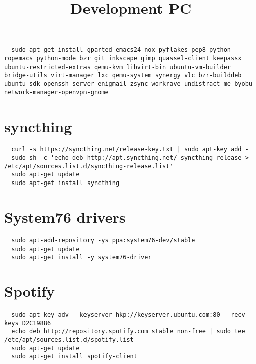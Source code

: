 \documentclass[12pt]{article}
\title{Development PC}
\begin{document}
\begin{verbatim}
  sudo apt-get install gparted emacs24-nox pyflakes pep8 python-ropemacs python-mode bzr git inkscape gimp quassel-client keepassx ubuntu-restricted-extras qemu-kvm libvirt-bin ubuntu-vm-builder bridge-utils virt-manager lxc qemu-system synergy vlc bzr-builddeb ubuntu-sdk openssh-server enigmail zsync workrave undistract-me byobu network-manager-openvpn-gnome
\end{verbatim}

\section{syncthing}

\begin{verbatim}
  curl -s https://syncthing.net/release-key.txt | sudo apt-key add -
  sudo sh -c 'echo deb http://apt.syncthing.net/ syncthing release > /etc/apt/sources.list.d/syncthing-release.list'
  sudo apt-get update
  sudo apt-get install syncthing
\end{verbatim}

\section{System76 drivers}

\begin{verbatim}
  sudo apt-add-repository -ys ppa:system76-dev/stable
  sudo apt-get update
  sudo apt-get install -y system76-driver
\end{verbatim}

\section{Spotify}

\begin{verbatim}
  sudo apt-key adv --keyserver hkp://keyserver.ubuntu.com:80 --recv-keys D2C19886
  echo deb http://repository.spotify.com stable non-free | sudo tee /etc/apt/sources.list.d/spotify.list
  sudo apt-get update
  sudo apt-get install spotify-client
\end{verbatim}
\end{document}
